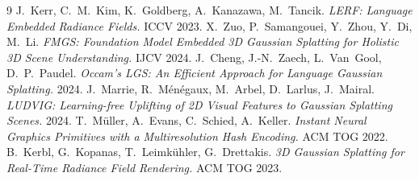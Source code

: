 \documentclass[11pt,a4paper]{article}
\begin{document}
\begin{thebibliography}{9}
 J.~Kerr, C.~M.~Kim, K.~Goldberg, A.~Kanazawa, M.~Tancik.
  \emph{LERF: Language Embedded Radiance Fields.} ICCV 2023.
 X.~Zuo, P.~Samangouei, Y.~Zhou, Y.~Di, M.~Li.
  \emph{FMGS: Foundation Model Embedded 3D Gaussian Splatting for Holistic 3D Scene Understanding.} IJCV 2024.
 J.~Cheng, J.-N.~Zaech, L.~Van~Gool, D.~P.~Paudel.
  \emph{Occam's LGS: An Efficient Approach for Language Gaussian Splatting.} 2024.
 J.~Marrie, R.~M\'en\'egaux, M.~Arbel, D.~Larlus, J.~Mairal.
  \emph{LUDVIG: Learning-free Uplifting of 2D Visual Features to Gaussian Splatting Scenes.} 2024.
 T.~M\"uller, A.~Evans, C.~Schied, A.~Keller.
  \emph{Instant Neural Graphics Primitives with a Multiresolution Hash Encoding.} ACM TOG 2022.
 B.~Kerbl, G.~Kopanas, T.~Leimk\"uhler, G.~Drettakis.
  \emph{3D Gaussian Splatting for Real-Time Radiance Field Rendering.} ACM TOG 2023.
\end{thebibliography}
\end{document}
